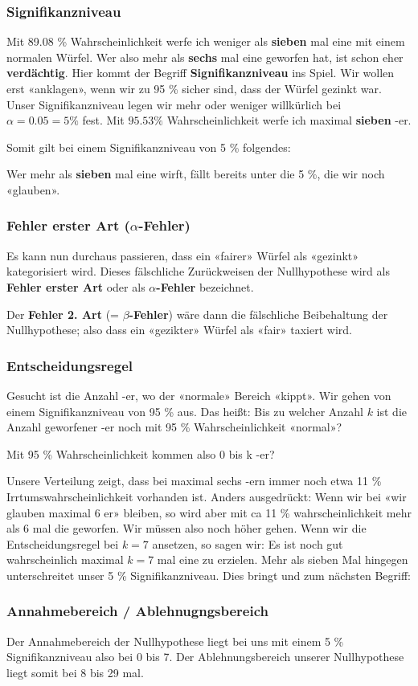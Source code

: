 
\subsubsection{Signifikanzniveau}
Mit 89.08 \% Wahrscheinlichkeit werfe ich weniger als \textbf{sieben}
mal eine  mit einem normalen Würfel. Wer also mehr als
\textbf{sechs} mal eine  geworfen hat, ist schon eher
\textbf{verdächtig}. Hier kommt der Begriff \textbf{Signifikanzniveau} ins
Spiel. Wir wollen erst «anklagen», wenn wir zu 95 \% sicher sind, dass
der Würfel gezinkt war. Unser Signifikanzniveau legen wir mehr oder
weniger willkürlich  bei $\alpha = 0.05 = 5 \%$ fest. Mit $95.53 \%$
Wahrscheinlichkeit werfe ich maximal \textbf{sieben} -er.

Somit gilt bei einem Signifikanzniveau von 5 \%
folgendes:

Wer mehr als \textbf{sieben} mal eine  wirft, fällt bereits
unter die 5 \%, die wir noch «glauben».

\subsubsection{Fehler erster Art ($\alpha$-Fehler)}

Es kann nun durchaus passieren, dass ein «fairer» Würfel als «gezinkt»
kategorisiert wird. Dieses fälschliche Zurückweisen der Nullhypothese
wird als \textbf{Fehler erster Art} oder als \textbf{$\alpha$-Fehler}
bezeichnet.

Der \textbf{Fehler 2. Art} (= \textbf{$\beta$-Fehler}) wäre dann die
fälschliche Beibehaltung der Nullhypothese; also dass ein «gezikter»
Würfel als «fair» taxiert wird.

\subsubsection{Entscheidungsregel}
Gesucht ist die Anzahl -er, wo der «normale» Bereich
«kippt». Wir gehen von einem Signifikanzniveau von 95 \% aus. Das
heißt: Bis zu welcher Anzahl $k$ ist die Anzahl geworfener
-er noch mit 95 \% Wahrscheinlichkeit «normal»?

Mit 95 \% Wahrscheinlichkeit kommen also 0 bis k -er?

Unsere Verteilung zeigt, dass bei maximal sechs -ern immer
noch etwa 11 \% Irrtumswahrscheinlichkeit vorhanden ist. Anders
ausgedrückt: Wenn wir bei «wir glauben maximal 6 er»
bleiben, so wird aber mit ca 11 \% wahrscheinlichkeit mehr als 6 mal
die  geworfen. Wir müssen also noch höher gehen.
Wenn wir die Entscheidungsregel bei $k=7$ ansetzen, so sagen wir: Es
ist noch gut wahrscheinlich maximal $k=7$ mal eine  zu
erzielen. Mehr als sieben Mal hingegen unterschreitet unser 5 \%
Signifikanzniveau. Dies bringt und zum nächsten Begriff:

\subsubsection{Annahmebereich / Ablehnugngsbereich}

Der Annahmebereich der Nullhypothese liegt bei uns mit einem 5 \%
Signifikanzniveau also bei 0 bis 7. Der Ablehnungsbereich unserer
Nullhypothese liegt somit bei 8 bis 29 mal. 


\newpage






